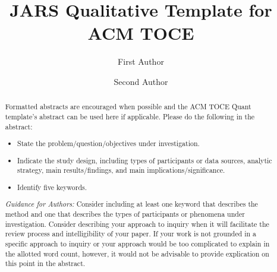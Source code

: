 \documentclass[acmsmall,screen,anonymous,review]{acmart}
\begin{document}
\title[JARS Qualitative Template for ACM TOCE]{JARS Qualitative Template for ACM TOCE}

\author{First Author}

\author{Second Author}

\renewcommand{\shortauthors}{Author et al.}

\newcommand{\AbstractCategory}[1]{%
  \par\addvspace{.5\baselineskip}%
  \noindent\textbf{#1}\quad\ignorespaces
}

%
\begin{abstract}

Formatted abstracts are encouraged when possible and the ACM TOCE Quant template's abstract can be used here if applicable. Please do the following in the abstract:

\begin{itemize}
    \item State the problem/question/objectives under investigation.

    \item Indicate the study design, including types of participants or data sources, analytic strategy, main results/findings, and main implications/significance.

    \item Identify five keywords.
\end{itemize}

\textit{Guidance for Authors:} Consider including at least one keyword that describes the method and one that describes the types of participants or phenomena under investigation.  Consider describing your approach to inquiry when it will facilitate the review process and intelligibility of your paper. If your work is not grounded in a specific approach to inquiry or your approach would be too complicated to explain in the allotted word count, however, it would not be advisable to provide explication on this point in the abstract.
\end{abstract}
\end{document}
